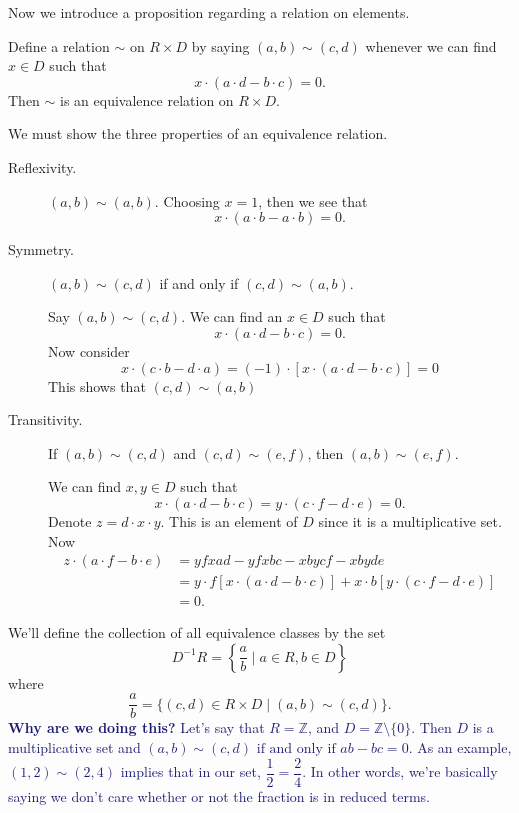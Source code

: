    Now we introduce a proposition regarding a relation on
    elements. 
    \begin{proposition}
        Define a relation $\sim$ on $R \times D$ by saying $(a, b) \sim
        (c,d)$ whenever we can find $x \in D$ such that 
        \[
            x\cdot (a\cdot d - b \cdot c) = 0.
        \]
        Then $\sim$ is an equivalence relation on $R \times D$. 
    \end{proposition}
    \begin{prf}
        We must show the three properties of an equivalence
        relation. 
        \begin{description}
            \item[Reflexivity.] $(a, b)\sim(a, b)$. Choosing $x = 1$,
            then we see that 
            \[
                x\cdot(a\cdot b - a\cdot b) = 0.  
            \]

            \item[Symmetry.] $(a, b) \sim (c, d)$ if and only if $(c,
            d) \sim (a, b)$. 

            Say $(a, b) \sim (c, d)$. We can find an $x \in D$ such
            that 
            \[
                x\cdot(a\cdot d - b \cdot c) = 0.
            \]
            Now consider 
            \[
                x\cdot (c\cdot b - d \cdot a) = (-1)\cdot[x\cdot (a\cdot d - b \cdot c)] = 0
            \]
            This shows that $(c, d) \sim (a, b)$ 

            \item[Transitivity.] If $(a, b) \sim (c, d)$ and $(c, d) \sim
            (e, f)$, then $(a, b) \sim (e, f)$. 

            We can find $x, y \in D$ such that 
            \[
                x \cdot (a \cdot d - b \cdot c) = y \cdot (c \cdot f - d \cdot e) = 0.
            \]
            Denote $z = d \cdot x \cdot y$. This is an element of
            $D$ since it is a multiplicative set. Now 
            \begin{align*}
                z \cdot (a \cdot f - b \cdot e) & = yfxad - yfxbc - xbycf - xbyde\\
                & = 
                y \cdot f [x \cdot (a \cdot d  - b \cdot c)] + x\cdot b[y \cdot(c \cdot f - d \cdot e)]\\
                & = 0.
            \end{align*}
        \end{description}
    \end{prf}
    \noindent We'll define the collection of all equivalence classes by the
    set 
    \[
        D^{-1}R = \left\{\frac{a}{b} \mid a \in R, b \in D  \right\}
    \]
    where 
    \[ 
        \dfrac{a}{b} = \big\{ (c, d) \in R \times D \mid (a ,
    b) \sim (c, d) \big\}.
    \]
    \textcolor{MidnightBlue}{\textbf{Why are we doing this?} Let's say that $R = \mathbb{Z}$, and
    $D = \mathbb{Z}\setminus\{0\}$. Then $D$ is a multiplicative
    set and $(a, b) \sim (c, d) \text{ if and only if } ab - bc = 0$. As an
    example, $(1, 2) \sim (2, 4)$ implies that in our set,
    $\dfrac{1}{2} = \dfrac{2}{4}$. In other words, we're basically
    saying we don't care whether or not the fraction is in reduced
    terms.}

